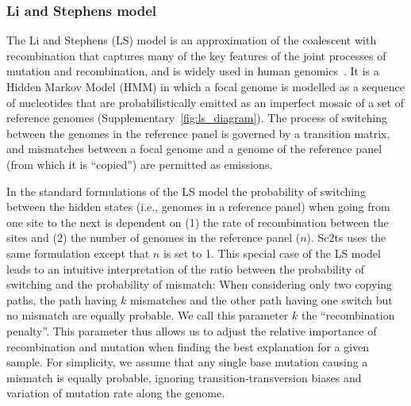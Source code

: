 \documentclass[12pt]{article}
\newcommand{\siref}[1]{Supplementary~\ref{#1}}
\begin{document}
\subsubsection*{Li and Stephens model}

The Li and Stephens (LS) model \cite{LiStephens2003} is an approximation of
the coalescent with recombination
that captures many of the key features of
the joint processes of mutation and recombination,
and is widely used in human genomics~\cite{Delaneau2019-wl,Browning2018-nk}.
It is a Hidden Markov Model (HMM) in which a focal genome
is modelled as a
sequence of nucleotides that are probabilistically emitted as
an imperfect mosaic of a set of reference genomes
(\siref{fig:ls_diagram}).
The process of switching between the genomes in the reference panel
is governed by a transition matrix,
and mismatches between a focal genome and a genome of the reference panel
(from which it is ``copied'') are permitted as emissions.

In the standard formulations of the LS model
\cite{LiStephens2003,Donnelly2010-coalescent}
the probability of switching
between the hidden states (i.e., genomes in a reference panel)
when going from one site to the next is dependent on
(1) the rate of recombination between the sites and
(2) the number of genomes in the reference panel ($n$).
Sc2ts uses the same formulation except that $n$ is set to 1.
This special case of the LS model leads to an intuitive interpretation of
the ratio between the probability of switching and the probability of mismatch:
When considering only two copying paths, the path having $k$ mismatches
and the other path having one switch but no mismatch are equally probable.
We call this parameter $k$ the ``recombination penalty''.
This parameter thus allows us to adjust
the relative importance of recombination and mutation
when finding the best explanation for a given sample.
For simplicity, we assume that any single base mutation
causing a mismatch is equally probable,
ignoring transition-transversion biases and
variation of mutation rate along the genome.
\end{document}

